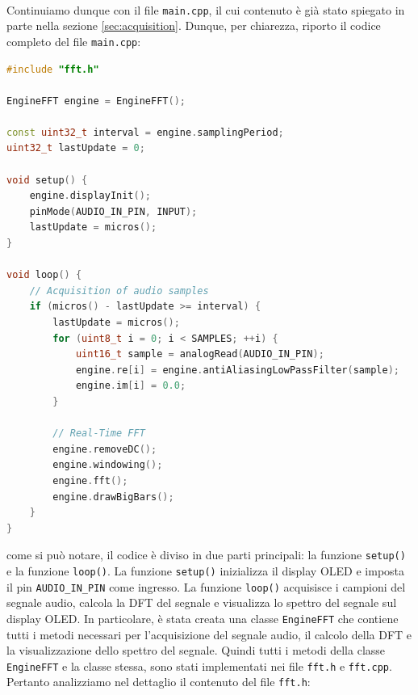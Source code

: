 \documentclass[a4paper,12pt]{report}  %
\newcommand{\lstinlinebg}[1]{\colorbox{backcolour}{\lstinline|#1|}}
\begin{document}
\noindent\\ Continuiamo dunque con il file \lstinlinebg{main.cpp}, il cui contenuto è già stato spiegato in parte nella sezione \ref{sec:acquisition}.
Dunque, per chiarezza, riporto il codice completo del file \lstinlinebg{main.cpp}:

\begin{lstlisting}[language=C++, keywords={EngineFFT, const, uint8_t, if, for, void, Serial, begin, uint16_t, analogRead, println, uint32_t, micros, , pinMode, INPUT, displayInit, antiAliasingLowPassFilter, removeDC, windowing, fft, drawBigBars}]
#include "fft.h"

EngineFFT engine = EngineFFT();

const uint32_t interval = engine.samplingPeriod;
uint32_t lastUpdate = 0;

void setup() {
    engine.displayInit();
    pinMode(AUDIO_IN_PIN, INPUT);
    lastUpdate = micros();
}

void loop() {
    // Acquisition of audio samples
    if (micros() - lastUpdate >= interval) {
        lastUpdate = micros();
        for (uint8_t i = 0; i < SAMPLES; ++i) {
            uint16_t sample = analogRead(AUDIO_IN_PIN);
            engine.re[i] = engine.antiAliasingLowPassFilter(sample);
            engine.im[i] = 0.0;
        }

        // Real-Time FFT
        engine.removeDC();
        engine.windowing();
        engine.fft();
        engine.drawBigBars();
    }
}
\end{lstlisting}

come si può notare, il codice è diviso in due parti principali: la funzione \lstinlinebg{setup()} e la funzione \lstinlinebg{loop()}.
La funzione \lstinlinebg{setup()} inizializza il display OLED e imposta il pin \lstinlinebg{AUDIO_IN_PIN} come ingresso.
La funzione \lstinlinebg{loop()} acquisisce i campioni del segnale audio, calcola la DFT del segnale e visualizza lo spettro del segnale sul display OLED.
In particolare, è stata creata una classe \lstinlinebg{EngineFFT} che contiene tutti i metodi necessari per l'acquisizione del segnale audio, il calcolo della DFT e la visualizzazione dello spettro del segnale.
Quindi tutti i metodi della classe \lstinlinebg{EngineFFT} e la classe stessa, sono stati implementati nei file \lstinlinebg{fft.h} e \lstinlinebg{fft.cpp}.
Pertanto analizziamo nel dettaglio il contenuto del file \lstinlinebg{fft.h}:
\end{document}
